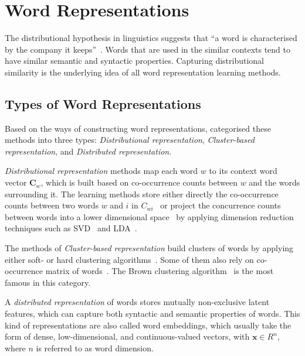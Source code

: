 \section{Word Representations}
\label{wordrep}
The distributional hypothesis in linguistics suggests that ``a word is characterised by the company it keeps''~\cite{firth1957}. Words that are used in the similar contexts tend to have similar semantic and syntactic properties. Capturing distributional similarity is the underlying idea of all word representation learning methods. 

\subsection{Types of Word Representations}
Based on the ways of constructing word representations,  categorised these methods into three types: \textit{Distributional representation},  \textit{Cluster-based representation}, and \textit{Distributed representation}.

\textit{Distributional representation} methods map each word $w$ to its context word vector $\mathbf{C}_w$, which is built based on co-occurrence counts between $w$ and the words surrounding it. The learning methods store either directly the co-occurrence counts between two words $w$ and $i$ in $C_{wi}$~\cite{sahlgren2006word,turney2010frequency,honkela1997self} or project the concurrence counts between words into a lower dimensional space~\cite{vrehuuvrek2010software,lund1996producing} by applying dimension reduction techniques such as SVD~\cite{dumais1988using} and LDA~\cite{blei2003latent}. 

The methods of \textit{Cluster-based representation} build clusters of words by applying either soft- or hard clustering algorithms~\cite{lin2009phrase,li2005semi}. Some of them also rely on co-occurrence matrix of words~\cite{pereira1993distributional}. The Brown clustering algorithm~\cite{Brown92class-basedn-gram} is the most famous in this category.

A \textit{distributed representation} of words stores mutually non-exclusive latent features, which can capture both syntactic and semantic properties of words. This kind of representations are also called word embeddings, which usually take the form of dense, low-dimensional, and continuous-valued vectors, with $\mathbf{x} \in R^n$, where $n$ is referred to as word dimension.

